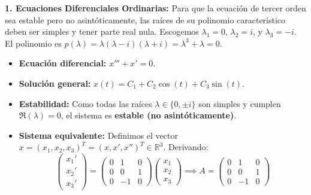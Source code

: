 \begin{sol}
\textbf{1. Ecuaciones Diferenciales Ordinarias:}
Para que la ecuación de tercer orden sea estable pero no asintóticamente, las raíces de su polinomio característico deben ser simples y tener parte real nula. Escogemos $\lambda_1 = 0$, $\lambda_2 = i$, y $\lambda_3 = -i$. 
El polinomio es $p(\lambda) = \lambda(\lambda - i)(\lambda + i) = \lambda^3 + \lambda = 0$.
\begin{itemize}[label=-]
    \item \textbf{Ecuación diferencial:} $x''' + x' = 0$.
    \item \textbf{Solución general:} $x(t) = C_1 + C_2 \cos(t) + C_3 \sin(t)$.
    \item \textbf{Estabilidad:} Como todas las raíces $\lambda \in \{0, \pm i\}$ son simples y cumplen $\Re(\lambda) = 0$, el sistema es \textbf{estable (no asintóticamente)}.
    \item \textbf{Sistema equivalente:} Definimos el vector $x = (x_1, x_2, x_3)^T = (x, x', x'')^T \in \mathbb{R}^3$. Derivando:
    $$ \begin{pmatrix} x_1' \\ x_2' \\ x_3' \end{pmatrix} = \begin{pmatrix} 0 & 1 & 0 \\ 0 & 0 & 1 \\ 0 & -1 & 0 \end{pmatrix} \begin{pmatrix} x_1 \\ x_2 \\ x_3 \end{pmatrix} \implies A = \begin{pmatrix} 0 & 1 & 0 \\ 0 & 0 & 1 \\ 0 & -1 & 0 \end{pmatrix} $$
\end{itemize}


\end{sol}
